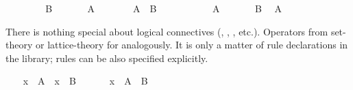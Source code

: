 \begin{isabellebody}
\ \ %
\isanewline
\ \ \ \ \isamarkupfalse%
\ B\ \isamarkupfalse%
\isanewline
\ \ \ \ \isamarkupfalse%
\ A\ \isamarkupfalse%
\isanewline
\ \ \isamarkupfalse%
\isanewline
\isanewline
\ \ \isamarkupfalse%
\ {}A\ {}\ B{}\isanewline
\ \ \isamarkupfalse%
\ \ %
\isanewline
\ \ \ \ \isamarkupfalse%
\ A\ \isamarkupfalse%
\isanewline
\ \ \ \ \isamarkupfalse%
\ B\ \isamarkupfalse%
\ {}A{}\ \isamarkupfalse%
\isanewline
\ \ \isamarkupfalse%
%
\endisatagproof
{\isafoldproof}%
%
\isadelimproof
\isanewline
%
\endisadelimproof
{}\isamarkupfalse%
%
\isamarkuptrue%
%
\begin{isamarkuptext}%
There is nothing special about logical connectives (, , ,  etc.).  Operators from
  set-theory or lattice-theory for analogously.  It is only a matter
  of rule declarations in the library; rules can be also specified
  explicitly.%
\end{isamarkuptext}%
\isamarkuptrue%
\isamarkupfalse%
\isanewline
{}\isanewline
%
\isadelimproof
\ \ %
\endisadelimproof
%
\isatagproof
{}\isamarkupfalse%
\ {}x\ {}\ A{}\ \ {}x\ {}\ B{}\ \isamarkupfalse%
\isanewline
\ \ \isamarkupfalse%
\ \isamarkupfalse%
\ {}x\ {}\ A\ {}\ B{}\ \isamarkupfalse%

\end{isabellebody}
